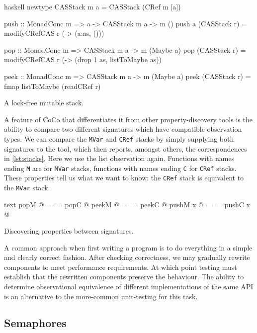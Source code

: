 \begin{listing}
\centering
\begin{cminted}{haskell}
newtype CASStack m a = CASStack (CRef m [a])

push :: MonadConc m => a -> CASStack m a -> m ()
push a (CASStack r) = modifyCRefCAS r (\as -> (a:as, ()))

pop :: MonadConc m => CASStack m a -> m (Maybe a)
pop (CASStack r) = modifyCRefCAS r (\as -> (drop 1 as, listToMaybe as))

peek :: MonadConc m => CASStack m a -> m (Maybe a)
peek (CASStack r) = fmap listToMaybe (readCRef r)
\end{cminted}
\caption{A lock-free mutable stack.}
\label{lst:crefstack}
\end{listing}

A feature of CoCo that differentiates it from other property-discovery
tools is the ability to compare two different signatures which have
compatible observation types.  We can compare the \verb|MVar| and
\verb|CRef| stacks by simply supplying both signatures to the tool,
which then reports, amongst others, the correspondences in
\cref{lst:stacks}.  Here we use the list observation again.  Functions
with names ending \verb|M| are for \verb|MVar| stacks, functions with
names ending \verb|C| for \verb|CRef| stacks.  These properties tell
us what we want to know: the \verb|CRef| stack is equivalent to the
\verb|MVar| stack.

\begin{listing}
\centering
\begin{cminted}{text}
   popM @  ===  popC @
  peekM @  ===  peekC @
pushM x @  ===  pushC x @
\end{cminted}
\caption{Discovering properties between signatures.}\label{lst:stacks}
\end{listing}

A common approach when first writing a program is to do everything in
a simple and clearly correct fashion.  After checking correctness, we
may gradually rewrite components to meet performance requirements.  At
which point testing must establish that the rewritten components
preserve the behaviour.  The ability to determine observational
equivalence of different implementations of the same API is an
alternative to the more-common unit-testing for this
task\cite{he1986}.

\subsection{Semaphores}
\label{sec:coco-cases-semaphore}

